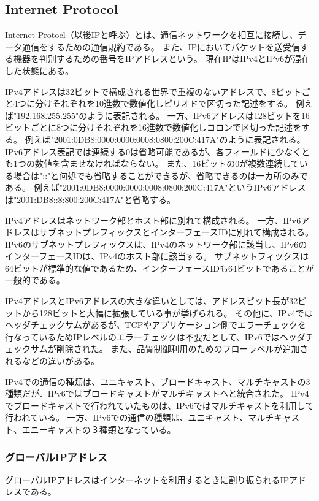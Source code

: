 \documentclass[a4j]{jarticle}
\begin{document}
\subsection{Internet Protocol}
Internet Protocl（以後IPと呼ぶ）とは、通信ネットワークを相互に接続し、データ通信をするための通信規約である。
また、IPにおいてパケットを送受信する機器を判別するための番号をIPアドレスという。
現在IPはIPv4とIPv6が混在した状態にある。

IPv4アドレスは32ビットで構成される世界で重複のないアドレスで、8ビットごと4つに分けそれぞれを10進数で数値化しピリオドで区切った記述をする。
例えば"192.168.255.255"のように表記される。
一方、IPv6アドレスは128ビットを16ビットごとに8つに分けそれぞれを16進数で数値化しコロンで区切った記述をする。
例えば"2001:0DB8:0000:0000:0008:0800:200C:417A"のように表記される。
IPv6アドレス表記では連続する0は省略可能であるが、各フィールドに少なくとも1つの数値を含ませなければならない。
また、16ビットの0が複数連続している場合は"::"と何処でも省略することができるが、省略できるのは一カ所のみである。
例えば"2001:0DB8:0000:0000:0008:0800:200C:417A"というIPv6アドレスは"2001:DB8::8:800:200C:417A"と省略する。

IPv4アドレスはネットワーク部とホスト部に別れて構成される。
一方、IPv6アドレスはサブネットプレフィックスとインターフェースIDに別れて構成される。
IPv6のサブネットプレフィックスは、IPv4のネットワーク部に該当し、IPv6のインターフェースIDは、IPv4のホスト部に該当する。
サブネットフィックスは64ビットが標準的な値であるため、インターフェースIDも64ビットであることが一般的である。

IPv4アドレスとIPv6アドレスの大きな違いとしては、アドレスビット長が32ビットから128ビットと大幅に拡張している事が挙げられる。
その他に、IPv4ではヘッダチェックサムがあるが、TCPやアプリケーション側でエラーチェックを行なっているためIPレベルのエラーチェックは不要だとして、IPv6ではヘッダチェックサムが削除された。
また、品質制御利用のためのフローラベルが追加されるなどの違いがある。

IPv4での通信の種類は、ユニキャスト、ブロードキャスト、マルチキャストの3種類だが、IPv6ではブロードキャストがマルチキャストへと統合された。
IPv4でブロードキャストで行われていたものは、IPv6ではマルチキャストを利用して行われている。
一方、IPv6での通信の種類は、ユニキャスト、マルチキャスト、エニーキャストの３種類となっている。

\subsubsection{グローバルIPアドレス}
グローバルIPアドレスはインターネットを利用するときに割り振られるIPアドレスである。
\end{document}

